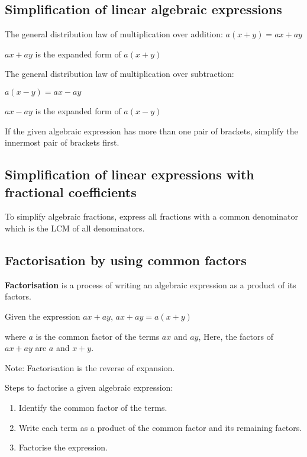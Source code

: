 \documentclass[../main]{subfiles}
\begin{document}
\subsection{Simplification of linear algebraic expressions}
The general distribution law of multiplication over addition:
\(a(x + y)= ax + ay\)

\(ax + ay \) is the expanded form of \(a(x + y)\)

The general distribution law of multiplication over subtraction:

\(a(x - y)= ax - ay\)

\(ax - ay \) is the expanded form of \(a(x - y)\)

If the given algebraic expression has  more than one  pair of brackets, simplify
the innermost pair of brackets first.

\subsection{Simplification of linear expressions with fractional coefficients}

To simplify algebraic fractions, express all fractions with a common denominator
which is the LCM of all denominators. 

\subsection{Factorisation by using common factors}
\textbf{Factorisation} is a process of writing an algebraic expression as a
product of its factors.

Given the expression \(ax+ay\),
\(ax + ay = a(x + y)\)

where \(a\) is the common factor of the terms \(ax\) and \(ay\), Here, the
factors of \(ax + ay\) are \(a\) and \(x + y\).

Note: Factorisation is the reverse of expansion.

Steps to factorise a given algebraic expression:
\begin{enumerate}
\item  Identify the common factor of the terms.
 
\item  Write each term as a product of the common factor and its remaining
  factors.
 
\item  Factorise the expression.
  
\end{enumerate}
\end{document}
